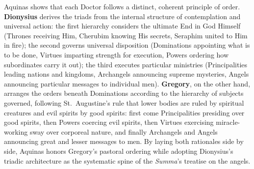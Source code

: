 Aquinas shows that each Doctor follows a distinct, coherent principle of order. \textbf{Dionysius} derives the triads from the internal structure of contemplation and universal action: the first hierarchy considers the ultimate End in God Himself (Thrones receiving Him, Cherubim knowing His secrets, Seraphim united to Him in fire); the second governs universal disposition (Dominations appointing what is to be done, Virtues imparting strength for execution, Powers ordering how subordinates carry it out); the third executes particular ministries (Principalities leading nations and kingdoms, Archangels announcing supreme mysteries, Angels announcing particular messages to individual men). \textbf{Gregory}, on the other hand, arranges the orders beneath Dominations according to the hierarchy of subjects governed, following St.~Augustine's rule that lower bodies are ruled by spiritual creatures and evil spirits by good spirits: first come Principalities presiding over good spirits, then Powers coercing evil spirits, then Virtues exercising miracle-working sway over corporeal nature, and finally Archangels and Angels announcing great and lesser messages to men. By laying both rationales side by side, Aquinas honors Gregory's pastoral ordering while adopting Dionysius's triadic architecture as the systematic spine of the \emph{Summa}'s treatise on the angels.
